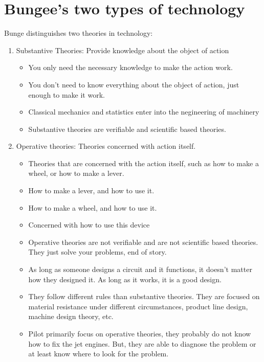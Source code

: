 \documentclass{article}
\begin{document}
\section*{Bungee's two types of technology}
Bunge distinguishes two theories in technology:
\begin{enumerate}
  \item Substantive Theories: Provide knowledge
    about the object of action
    \begin{itemize}
      \item You only need the necessary knowledge
        to make the action work.
      \item You don't need to know everything about the
        object of action, just enough to make it work.
      \item Classical mechanics and statistics enter
        into the negineering of machinery
      \item Substantive theories are verifiable
        and scientific based theories.
    \end{itemize}
  \item Operative theories: Theories
    concerned with action itself.
    \begin{itemize}
      \item Theories that are concerned with the action itself,
        such as how to make a wheel, or how to make a lever.
      \item How to make a lever, and how to use it.
      \item How to make a wheel, and how to use it.
      \item Concerned with how to use this device
      \item Operative theories are not verifiable
        and are not scientific based theories.
        They just solve your problems, end of story.
      \item As long as someone designs a circuit and it functions,
        it doesn't matter how they designed it.
        As long as it works, it is a good design.
      \item They follow different rules than substantive theories.
        They are focused on material resistance under different circumstances,
        product line design, machine design theory, etc.
      \item Pilot primarily focus on operative theories,
        they probably do not know how to fix the jet engines.
        But, they are able to diagnose the problem or at
        least know where to look for the problem.


\end{itemize}
\end{enumerate}
\end{document}
